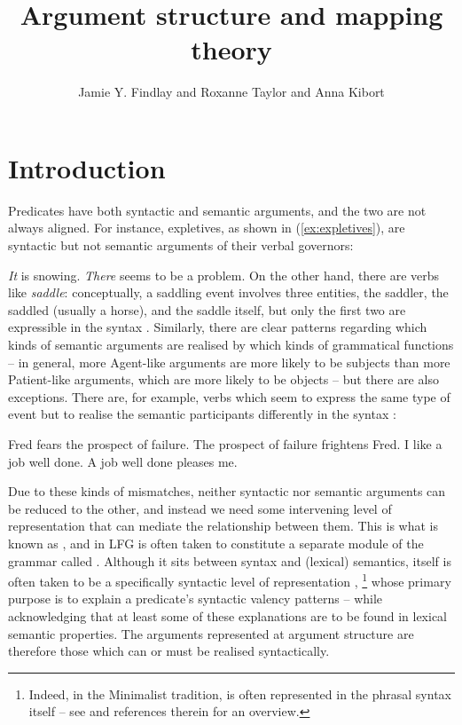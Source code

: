 \documentclass[output=paper]{langscibook}
\author{Jamie Y. Findlay\affiliation{University of Oslo}  and  Roxanne Taylor\affiliation{University of Huddersfield} and  Anna Kibort\affiliation{Trinity College Library} }
\title{Argument structure and mapping theory}
\begin{document}
\maketitle
\label{chap:Mapping}

\section{Introduction}
\label{sec:argstr:intro}

Predicates have both syntactic and semantic arguments, and the two are not
always aligned. For instance, expletives, as shown in (\ref{ex:expletives}), are
syntactic but not semantic arguments of their verbal governors:

\ea\label{ex:expletives}
\ea \emph{It} is snowing.
\ex \emph{There} seems to be a problem.
\z
\z
%
On the other hand, there are verbs like \textit{saddle}: conceptually, a
saddling event involves three entities, the saddler, the saddled (usually a
horse), and the saddle itself, but only the first two are expressible in the
syntax \citep[cf.][]{bresnan:polyadicity}. Similarly, there are clear patterns
regarding which kinds of semantic arguments are realised by which kinds of
grammatical functions -- in general, more Agent-like arguments are more likely
to be subjects than more Patient-like arguments, which are more likely to be
objects -- but there are also exceptions. There are, for example, verbs which
seem to express the same type of event but to realise the semantic participants
differently in the syntax \citep[132]{Rappaport83}:

\ea\label{ex:fear-frighten}
\ea Fred fears the prospect of failure.
\ex The prospect of failure frightens Fred.
\z
\ex\label{ex:like-please}
\ea I like a job well done.
\ex A job well done pleases me.
\z
\z
%

Due to these kinds of mismatches, neither syntactic nor semantic arguments can
be reduced to the other, and instead we need some intervening level of
representation that can mediate the relationship between them. This is what is
known as , and in LFG is often taken to constitute a
separate module of the grammar called \astruc. Although it sits between syntax
and (lexical) semantics, \argstruc{} itself is often taken to be a specifically
syntactic level of representation \citep{Alsina2001},%
%
\footnote{Indeed, in the Minimalist tradition, \argstruc{} is often represented
  in the phrasal syntax itself -- see \citet{harley:arg-struc} and references
  therein for an overview.}
%
whose primary purpose is to explain a predicate's syntactic valency patterns --
while acknowledging that at least some of these explanations are to be found in
lexical semantic properties. The arguments represented at argument structure are
therefore those which can or must be realised syntactically.
\end{document}
